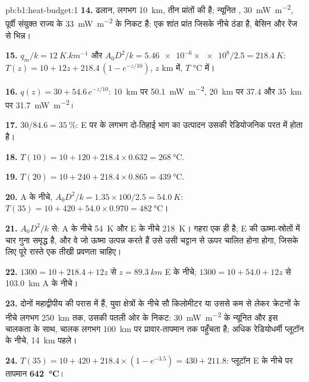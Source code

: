\begin{solution}{pb:b1:heat-budget:1}
\textbf{14.} ढलान, लगभग \qty{10}{km}, तीन प्रांतों की है; न्यूनित , \qty{30}{mW.m^{-2}}, पूर्वी संयुक्त राज्य के \qty{33}{mW.m^{-2}} के निकट है: एक शांत प्रांत जिसके नीचे ठंडा  है, बेसिन और रेंज से भिन्न।

\textbf{15.} $q_m/k = \qty{12}{K.km^{-1}}$ और $A_0D^2/k = \num{5.46e-6}\times\num{e8}/2.5
= \qty{218.4}{K}$: $T(z) = 10 + 12z + 218.4\,(1 - e^{-z/10})$, $z$ km में, $T$
\unit{\degreeCelsius} में।

\textbf{16.} $q(z) = 30 + 54.6\,e^{-z/10}$: \qty{10}{km} पर \qty{50.1}{mW.m^{-2}},
\qty{20}{km} पर \num{37.4} और \qty{35}{km} पर \qty{31.7}{mW.m^{-2}}।

\textbf{17.} $30/84.6 = \qty{35}{\percent}$: E पर  के लगभग दो-तिहाई भाग का उत्पादन उसकी रेडियोजनिक परत में होता है।

\textbf{18.} $T(10) = 10 + 120 + 218.4\times0.632 = \qty{268}{\degreeCelsius}$.

\textbf{19.} $T(20) = 10 + 240 + 218.4\times0.865 = \qty{439}{\degreeCelsius}$.

\textbf{20.} A के नीचे, $A_0D^2/k = 1.35\times100/2.5 = \qty{54.0}{K}$:
$T(35) = 10 + 420 + 54.0\times0.970 = \qty{482}{\degreeCelsius}$।

\textbf{21.} $A_0D^2/k$ से: A के नीचे \qty{54}{K} और E के नीचे \qty{218}{K}। गहरा  एक ही है; E की  ऊष्मा-स्रोतों में चार गुना समृद्ध है, और वे जो ऊष्मा उत्पन्न करते हैं उसे उसी चट्टान से ऊपर चालित होना होगा, जिसके लिए पूरे रास्ते एक तीखी प्रवणता चाहिए।

\textbf{22.} $1300 = 10 + 218.4 + 12z$ से $z = \qty{89.3}{km}$ E के नीचे; $1300 = 10 + 54.0 + 12z$ से \qty{103.0}{km} A के नीचे।

\textbf{23.} दोनों महाद्वीपीय  की परास में हैं, युवा क्षेत्रों के नीचे सौ किलोमीटर या उससे कम से लेकर क्रेटनों के नीचे लगभग \qty{250}{km} तक, उसकी पतली ओर के निकट: \qty{30}{mW.m^{-2}} के न्यूनित  और इस चालकता के साथ, चालक  लगभग \qty{100}{km} पर प्रावार-तापमान तक पहुँचता है; अधिक रेडियोधर्मी प्लूटॉन के नीचे, \qty{14}{km} पहले।

\textbf{24.} $T(35) = 10 + 420 + 218.4\times(1 - e^{-3.5}) = 430 + 211.8$: प्लूटॉन E के नीचे  पर तापमान
\textbf{\qty[text-series-to-math=true]{642}{\degreeCelsius}}।
\end{solution}
